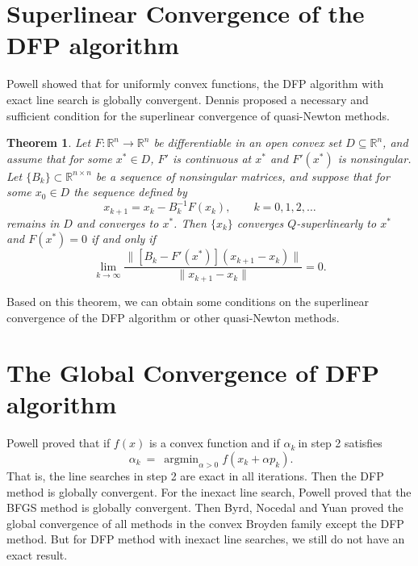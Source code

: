 \documentclass[12pt,a4paper]{article}  %
\newcounter{cite}
\newtheorem{theorem}{Theorem}[section]
\theoremstyle{definition}
\numberwithin{equation}{section}
\DeclareMathOperator*{\argmin}{argmin}
\begin{document}
\section{Superlinear Convergence of the DFP algorithm}
Powell\cite{powell1971convergence} showed that for uniformly convex functions, the DFP algorithm with exact line search is globally convergent.
 Dennis\cite{636c0025-00c1-3c96-8fa3-324390e0f75f} proposed a necessary and sufficient condition for the superlinear convergence of quasi-Newton methods. 
\begin{theorem}
	Let \(F:\mathbb{R}^n \to \mathbb{R}^n\) be differentiable in an open convex set \(D \subseteq \mathbb{R}^n\), and assume that for some \(x^* \in D\), \(F'\) is continuous at \(x^*\) and \(F'(x^*)\) is nonsingular. Let \(\{B_k\} \subset \mathbb{R}^{n \times n}\) be a sequence of nonsingular matrices, and suppose that for some \(x_0 \in D\) the sequence defined by
	\begin{equation}
	x_{k+1} = x_k - B_k^{-1} F(x_k), \qquad k = 0,1,2,\dots
	\end{equation}
	remains in \(D\) and converges to \(x^*\). Then \(\{x_k\}\) converges \(Q\)-superlinearly to \(x^*\) and \(F(x^*) = 0\) if and only if
	\begin{equation}
	\lim_{k\to\infty} \frac{\big\| [B_k - F'(x^*)] (x_{k+1} - x_k) \big\|}{\| x_{k+1} - x_k \|} = 0.
	\end{equation}
\end{theorem}
Based on this theorem, we can obtain some conditions on the superlinear convergence of the DFP algorithm or other quasi-Newton methods.\cite{d4c4e1e1-b552-312d-a127-ddfcff7c0c72}

\section{The Global Convergence of DFP algorithm}
Powell\cite{powell1971convergence} proved that if $f(x)$ is a convex function and if $\alpha_k~$in step 2 satisfies
\begin{equation}
	~\alpha_k~=~\argmin_{\alpha>0}f(x_k+\alpha p_k).
\end{equation}
That is, the line searches in step 2 are exact in all iterations. Then the DFP method is globally convergent. For the inexact line search, Powell\cite{zbMATH03529352} proved that the BFGS method is globally convergent. Then Byrd, Nocedal and Yuan\cite{badf1033-31a5-3157-8131-6cdeb5b73b0c} proved the global convergence of all methods in the convex Broyden family except the DFP method. But for DFP method with inexact line searches, we still do not have an exact result.
\end{document}
